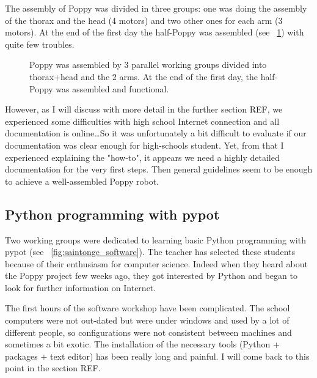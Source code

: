 The assembly of Poppy was divided in three groups: one was doing the assembly of the thorax and the head (4 motors) and two other ones for each arm (3 motors). At the end of the first day the half-Poppy was assembled (see \figurename~\ref{fig:saintonge_assembly}) with quite few troubles.

\begin{figure}[h!]
\centering
    \hfil
    \hfil
    \hfil
    \caption{Poppy was assembled by 3 parallel working groups divided into thorax+head and the 2 arms. At the end of the first day, the half-Poppy was assembled and functional. }
    \label{fig:saintonge_assembly}
\end{figure}

However, as I will discuss with more detail in the further section REF, we experienced some difficulties with high school Internet connection and all documentation is online\dots So it was unfortunately a bit difficult to evaluate if our documentation was clear enough for high-schools student. Yet, from that I experienced explaining the "how-to", it appears we need a highly detailed documentation for the very first steps. Then general guidelines seem to be enough to achieve a well-assembled Poppy robot.

\subsection{Python programming with pypot}

Two working groups were dedicated to learning basic Python programming with pypot (see \figurename~\ref{fig:saintonge_software}). The teacher has selected these students because of their enthusiasm for computer science. Indeed when they heard about the Poppy project few weeks ago, they got interested by Python and began to look for further information on Internet.

The first hours of the software workshop have been complicated. The school computers were not out-dated but were under windows and used by a lot of different people, so configurations were not consistent between machines and sometimes a bit exotic. The installation of the necessary tools (Python + packages + text editor) has been really long and painful. I will come back to this point in the section REF.

